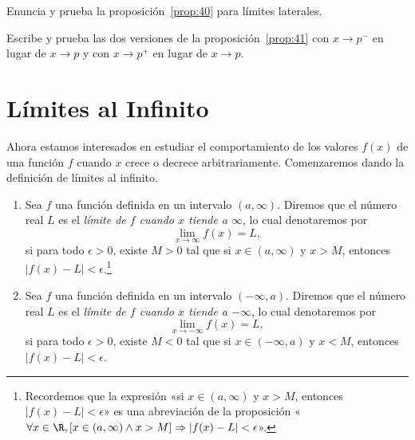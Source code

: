 \documentclass[12pt,a4paper]{book}
\begin{document}
    \begin{ejercicio}\label{ej:159}
        Enuncia y prueba la proposición~\ref{prop:40} para límites laterales.
    \end{ejercicio}

    \begin{ejercicio}\label{ej:160}
        Escribe y prueba las dos versiones de la proposición~\ref{prop:41} con
        $x\to p^{-}$ en lugar de $x\to p$ y con $x\to p^{+}$ en lugar de $x\to p$.
    \end{ejercicio}

    \section{Límites al Infinito}

    Ahora estamos interesados en estudiar el comportamiento de los valores
    $f(x)$ de una función $f$ cuando $x$ crece o decrece arbitrariamente. Comenzaremos
    dando la definición de límites al infinito.

    \begin{definicion}\label{def:31}
        \begin{enumerate}
            \item Sea $f$ una función definida en un intervalo $(a,\infty)$. Diremos que el número
            real $L$ es el \textit{límite de $f$ cuando $x$ tiende a $\infty$}, lo cual denotaremos por
            \begin{equation}\label{eq:4.17}
                \lim_{x\to\infty}f(x)=L,
            \end{equation}
            si para todo $\epsilon>0$, existe $M>0$ tal que si $x\in(a,\infty)$ y $x>M$, entonces
            $|f(x)-L|<\epsilon$.\footnote{Recordemos que la expresión «si $x\in(a,\infty)$ y $x>M$, entonces $|f(x)-L|<\epsilon$» es una
            abreviación de la proposición «$\forall x\in\R,[x\in(a,\infty)\wedge x>M]\Rightarrow|f(x)-L|<\epsilon$».}
            \item Sea $f$ una función definida en un intervalo $(-\infty,a)$. Diremos que el número
            real $L$ es el \textit{límite de $f$ cuando $x$ tiende a $-\infty$}, lo cual denotaremos por
            \begin{equation}\label{eq:4.18}
                \lim_{x\to-\infty}f(x)=L,
            \end{equation}
            si para todo $\epsilon>0$, existe $M<0$ tal que si $x\in(-\infty,a)$ y $x<M$, entonces
            $|f(x)-L|<\epsilon$.
        \end{enumerate}
    \end{definicion}
\end{document}
